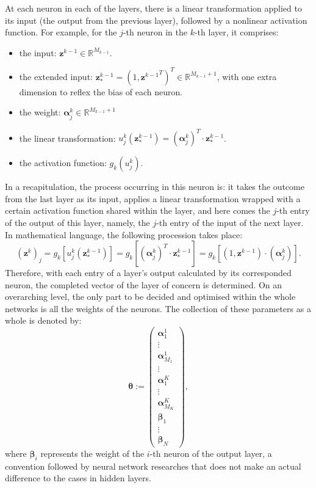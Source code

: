 \documentclass[11pt,twoside]{article}
\numberwithin{Theorem}{section}
\numberwithin{Definition}{section}
\numberwithin{Lemma}{section}
\numberwithin{Algorithm}{section}
\numberwithin{equation}{section}
\begin{document}
At each neuron in each of the layers, there is a linear transformation applied to its input (the output from the previous layer), followed by a nonlinear activation function. For example, for the $j$-th neuron in the $k$-th layer, it comprises:
\begin{itemize}
    \item the input: $\mathbf{z}^{k-1}\in\mathbb{R}^{M_{k-1}}$.
    \item the extended input: $\mathbf{z}_*^{k-1}=\left(1,{\mathbf{z}^{k-1}}^T\right)^T\in\mathbb{R}^{M_{k-1}+1}$, with one extra dimension to reflex the bias of each neuron.
    \item the weight: $\boldsymbol{\alpha}^k_j\in\mathbb{R}^{M_{k-1}+1}$
    \item the linear transformation: $u_j^k(\mathbf{z}_*^{k-1})={(\boldsymbol{\alpha}^k_j)}^T\cdot\mathbf{z}_*^{k-1}$.
    \item the activation function: $g_k(u_j^k)$.
\end{itemize}
In a recapitulation, the process occurring in this neuron is: it takes the outcome from the last layer as its input, applies a linear transformation wrapped with a certain activation function shared within the layer, and here comes the $j$-th entry of the output of this layer, namely, the $j$-th entry of the input of the next layer. In mathematical language, the following procession takes place:
\begin{equation*}
\left(\mathbf{z}^{k}\right)_j=g_k\left[u_j^k(\mathbf{z}_*^{k-1})\right]=g_k\left[{(\boldsymbol{\alpha}^k_j)}^T\cdot\mathbf{z}_*^{k-1}\right]=g_k\left[
(1,\mathbf{z}^{k-1})\cdot(\boldsymbol{\alpha}^k_j)
\right].
\end{equation*}
Therefore, with each entry of a layer's output calculated by its corresponded neuron, the completed vector of the layer of concern is determined. On an overarching level, the only part to be decided and optimised within the whole networks is all the weights of the neurons. The collection of these parameters as a whole is denoted by:
$$
\boldsymbol{\theta}:=
\begin{pmatrix}
\boldsymbol{\alpha}^1_1\\
\vdots\\
\boldsymbol{\alpha}^1_{M_1}\\
\vdots\\
\boldsymbol{\alpha}^K_1\\
\vdots\\
\boldsymbol{\alpha}^K_{M_K}\\
\boldsymbol{\beta}_1\\
\vdots\\
\boldsymbol{\beta}_N
\end{pmatrix},
$$
where $\boldsymbol{\beta}_i$ represents the weight of the $i$-th neuron of the output layer, a convention followed by neural network researches that does not make an actual difference to the cases in hidden layers.
\end{document}
